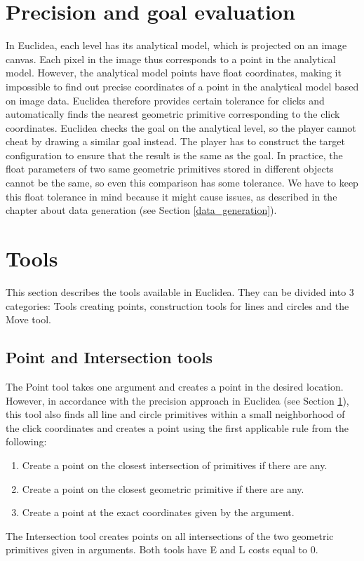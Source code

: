 \section{Precision and goal evaluation}
\label{euclidea_precision}
In Euclidea, each level has its analytical model, which is projected on an image canvas. Each pixel in the image thus corresponds to a point in the analytical model. However, the analytical model points have float coordinates, making it impossible to find out precise coordinates of a point in the analytical model based on image data. Euclidea therefore provides certain tolerance for clicks and automatically finds the nearest geometric primitive corresponding to the click coordinates. 
\newline \newline
Euclidea checks the goal on the analytical level, so the player cannot cheat by drawing a similar goal instead. The player has to construct the target configuration to ensure that the result is the same as the goal.
\newline
\newline
In practice, the float parameters of two same geometric primitives stored in different objects cannot be the same, so even this comparison has some tolerance. We have to keep this float tolerance in mind because it might cause issues, as described in the chapter about data generation (see Section \ref{data_generation}).
\section{Tools}
\label{Euclidea_tools}
This section describes the tools available in Euclidea. They can be divided into 3 categories: Tools creating points, construction tools for lines and circles and the Move tool.
\label{euclidea_tools}
\subsection{Point and Intersection tools} \label{point_tool}
The Point tool takes one argument and creates a point in the desired location. However, in accordance with the precision approach in Euclidea (see Section \ref{euclidea_precision}), this tool also finds all line and circle primitives within a small neighborhood of the click coordinates and creates a point using the first applicable rule from the following:
\begin{enumerate}
  \item Create a point on the closest intersection of primitives if there are any.
  \item Create a point on the closest geometric primitive if there are any.
  \item Create a point at the exact coordinates given by the argument.
\end{enumerate}
\newline \newline
The Intersection tool creates points on all intersections of the two geometric primitives given in arguments. 
Both tools have E and L costs equal to 0.

